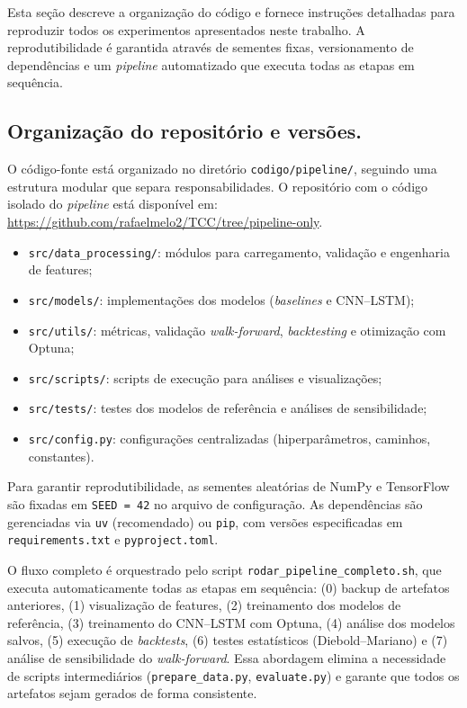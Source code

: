 Esta seção descreve a organização do código e fornece instruções detalhadas para reproduzir todos os experimentos apresentados neste trabalho.
A reprodutibilidade é garantida através de sementes fixas, versionamento de dependências e um \textit{pipeline} automatizado que executa todas as etapas em sequência.

\subsection{Organização do repositório e versões.}
O código-fonte está organizado no diretório \texttt{codigo/pipeline/}, seguindo uma estrutura modular que separa responsabilidades. O repositório com o código isolado do \textit{pipeline} está disponível em: \url{https://github.com/rafaelmelo2/TCC/tree/pipeline-only}.

\begin{itemize}
  \item \texttt{src/data\_processing/}: módulos para carregamento, validação e engenharia de features;
  \item \texttt{src/models/}: implementações dos modelos (\textit{baselines} e CNN--LSTM);
  \item \texttt{src/utils/}: métricas, validação \textit{walk-forward}, \textit{backtesting} e otimização com Optuna;
  \item \texttt{src/scripts/}: scripts de execução para análises e visualizações;
  \item \texttt{src/tests/}: testes dos modelos de referência e análises de sensibilidade;
  \item \texttt{src/config.py}: configurações centralizadas (hiperparâmetros, caminhos, constantes).
\end{itemize}

Para garantir reprodutibilidade, as sementes aleatórias de NumPy e TensorFlow são fixadas em \texttt{SEED = 42} no arquivo de configuração.
As dependências são gerenciadas via \texttt{uv} (recomendado) ou \texttt{pip}, com versões especificadas em \texttt{requirements.txt} e \texttt{pyproject.toml}.

O fluxo completo é orquestrado pelo script \texttt{rodar\_pipeline\_completo.sh}, que executa automaticamente todas as etapas em sequência:
(0) backup de artefatos anteriores,
(1) visualização de features,
(2) treinamento dos modelos de referência,
(3) treinamento do CNN--LSTM com Optuna,
(4) análise dos modelos salvos,
(5) execução de \textit{backtests},
(6) testes estatísticos (Diebold--Mariano) e
(7) análise de sensibilidade do \textit{walk-forward}.
Essa abordagem elimina a necessidade de scripts intermediários (\texttt{prepare\_data.py}, \texttt{evaluate.py}) e garante que todos os artefatos sejam gerados de forma consistente.

